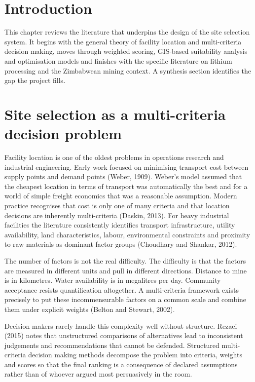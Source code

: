 \documentclass[12pt,a4paper]{report}
\begin{document}
\section{Introduction}
This chapter reviews the literature that underpins the design of the
site selection system. It begins with the general theory of facility
location and multi-criteria decision making, moves through weighted
scoring, GIS-based suitability analysis and optimisation models and
finishes with the specific literature on lithium processing and the
Zimbabwean mining context. A synthesis section identifies the gap the
project fills.

\section{Site selection as a multi-criteria decision problem}
Facility location is one of the oldest problems in operations research
and industrial engineering. Early work focused on minimising transport
cost between supply points and demand points (Weber, 1909). Weber's
model assumed that the cheapest location in terms of transport was
automatically the best and for a world of simple freight economics that
was a reasonable assumption. Modern practice recognises that cost is
only one of many criteria and that location decisions are inherently
multi-criteria (Daskin, 2013). For heavy industrial facilities the
literature consistently identifies transport infrastructure, utility
availability, land characteristics, labour, environmental constraints
and proximity to raw materials as dominant factor groups (Choudhary and
Shankar, 2012).

The number of factors is not the real difficulty. The difficulty is
that the factors are measured in different units and pull in different
directions. Distance to mine is in kilometres. Water availability is
in megalitres per day. Community acceptance resists quantification
altogether. A multi-criteria framework exists precisely to put these
incommensurable factors on a common scale and combine them under
explicit weights (Belton and Stewart, 2002).

Decision makers rarely handle this complexity well without structure.
Rezaei (2015) notes that unstructured comparisons of alternatives lead
to inconsistent judgements and recommendations that cannot be defended.
Structured multi-criteria decision making methods decompose the
problem into criteria, weights and scores so that the final ranking is
a consequence of declared assumptions rather than of whoever argued
most persuasively in the room.
\end{document}
